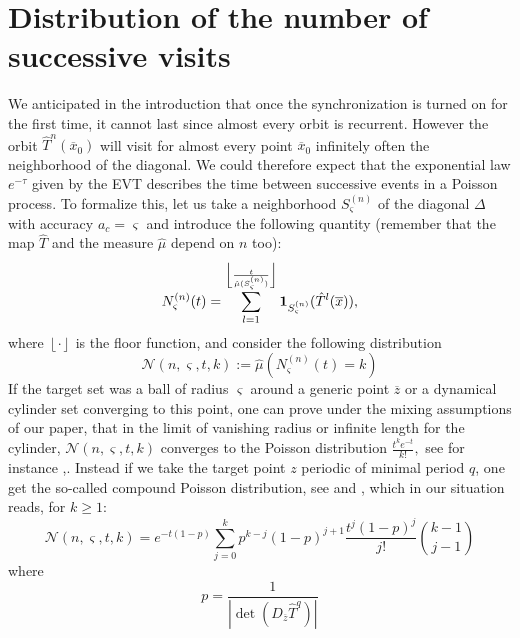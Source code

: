\documentclass[12pt,reqno,a4paper]{amsart}
\def\ox{\overline{x}}
\begin{document}
\section{Distribution of the number of successive  visits}
We anticipated in the introduction that once the synchronization is turned on for the first time, it cannot last since almost every orbit is recurrent. However  the orbit $\hat{T}^n(\overline{x}_0)$ will visit for almost every point $\overline{x}_0$ infinitely often  the neighborhood of the diagonal. We could therefore  expect that the exponential law $e^{-\tau}$ given by the EVT describes the time between successive events in a Poisson process. To formalize this, let us take a neighborhood $S^{(n)}_{\varsigma}$ of the diagonal $\Delta$ with accuracy $a_c=\varsigma$  and introduce the following quantity (remember that the map $\hat{T}$ and the measure $\hat{\mu}$ depend on $n$ too):
$$
N^{(n)}_{\varsigma}(t)=\sum_{l=1}^{\left \lfloor{\frac{t}{\hat{\mu}(S^{(n)}_{\varsigma})}}\right \rfloor}{\bf 1}_{S^{(n)}_{\varsigma}}(\hat{T}^l(\ox)),
$$
where $\left \lfloor{\cdot}\right \rfloor$ is the floor function, and consider the following distribution
$$
\mathcal{N}(n,\varsigma,t,k):=\hat{\mu}(N^{(n)}_{\varsigma}(t)=k)
$$
If the target set was a ball of radius $\varsigma$ around a generic point $\overline{z}$ or a dynamical cylinder set converging to this point,  one can prove under the  mixing assumptions of our  paper,    that in the limit of vanishing radius or infinite length for the cylinder,   $\mathcal{N}(n,\varsigma,t,k)$ converges to the Poisson distribution $\frac{t^ke^{-t}}{k!},$ see for instance \cite{V1},\cite{V2}. Instead if we take the target point $z$ periodic of minimal period $q$, one get the so-called compound Poisson distribution, see  \cite{HV} and \cite{AJFM3}, which in our situation reads, for $k\ge 1:$
\begin{equation}\label{PO}
\mathcal{N}(n,\varsigma,t,k)= e^{-t(1-p)}\sum_{j=0}^kp^{k-j}(1-p)^{j+1}\frac{t^j(1-p)^j}{j!}\binom{k-1}{j-1}
\end{equation}
where
\begin{equation}\label{pp}
p=\frac{1}{|\det(D_{\overline{z}}\hat{T}^q)|}
\end{equation}
\end{document}
